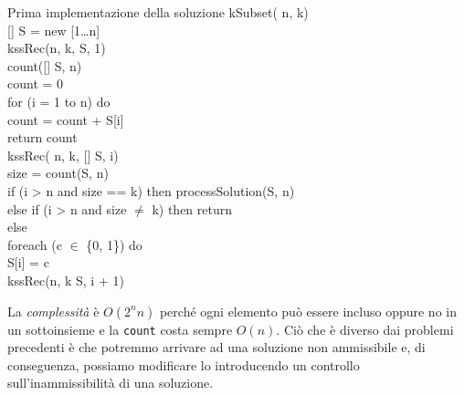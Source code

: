 \begin{minicode}{Prima implementazione della soluzione}
\ind kSubset( n,  k)\\
    [] S = new [1\dots n]\\
    kssRec(n, k, S, 1)\\

\noindent{}
\rmindent\ind{} count([] S,  n)\\
     count = 0\\
    \indf for (i = 1 to n) do\\
        count = count + S[i]\\
    \indf return count\\

\ind kssRec( n,  k, [] S,  i)\\
     size = count(S, n)\\
    \indf if (i > n and size == k) then\hfill{}
        processSolution(S, n)\\
    \indf else if (i > n and size $\neq$ k) then\hfill{}
        return\\
    \indf else\\
        \indff foreach (c $\in$ \{0, 1\}) do\\
            S[i] = c\\
            kssRec(n, k S, i + 1)
\end{minicode}

\noindent
La \emph{complessità} è $O(2^nn)$ perché ogni elemento può essere incluso oppure
no in un sottoinsieme e la \texttt{count} costa sempre $O(n)$. Ciò che è
diverso dai problemi precedenti è che potremmo arrivare ad una soluzione non
ammissibile e, di conseguenza, possiamo modificare lo 
introducendo un controllo sull'inammissibilità di una soluzione.

